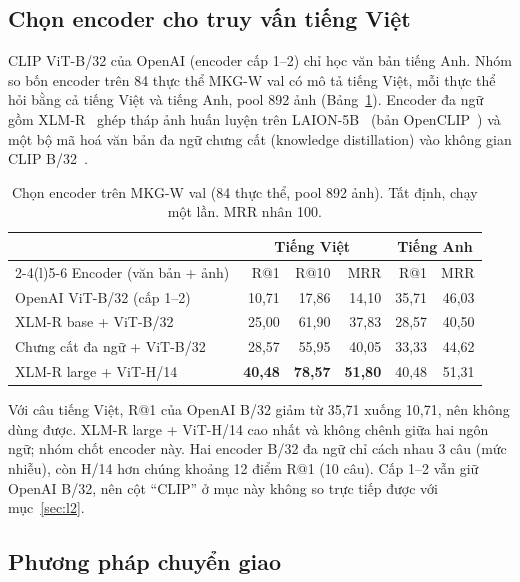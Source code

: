\subsection{Chọn encoder cho truy vấn tiếng Việt}\label{sec:vn-encoder}

CLIP ViT-B/32 của OpenAI (encoder cấp 1--2) chỉ học văn bản tiếng Anh. Nhóm so bốn encoder trên 84 thực thể MKG-W
val có mô tả tiếng Việt, mỗi thực thể hỏi bằng cả tiếng Việt và tiếng Anh, pool 892 ảnh
(Bảng~\ref{tab:vn-encoder}). Encoder đa ngữ gồm XLM-R~\cite{vn-conneau2020xlmr} ghép tháp ảnh huấn luyện trên
LAION-5B~\cite{vn-schuhmann2022laion5b} (bản OpenCLIP~\cite{vn-ilharco2021openclip}) và một bộ mã hoá văn bản đa
ngữ chưng cất (knowledge distillation) vào không gian CLIP B/32~\cite{vn-reimers2020multilingual}.

\begin{table}[t]
\centering
\caption{Chọn encoder trên MKG-W val (84 thực thể, pool 892 ảnh). Tất định, chạy một lần. MRR nhân 100.}
\label{tab:vn-encoder}
\footnotesize
\setlength{\tabcolsep}{3pt}
\begin{tabular}{@{}lrrrrr@{}}
\toprule
 & \multicolumn{3}{c}{Tiếng Việt} & \multicolumn{2}{c}{Tiếng Anh} \\
\cmidrule(lr){2-4}\cmidrule(l){5-6}
Encoder (văn bản + ảnh) & R@1 & R@10 & MRR & R@1 & MRR \\
\midrule
OpenAI ViT-B/32 (cấp 1--2) & 10,71 & 17,86 & 14,10 & 35,71 & 46,03 \\
XLM-R base + ViT-B/32 & 25,00 & 61,90 & 37,83 & 28,57 & 40,50 \\
Chưng cất đa ngữ + ViT-B/32 & 28,57 & 55,95 & 40,05 & 33,33 & 44,62 \\
XLM-R large + ViT-H/14 & \textbf{40,48} & \textbf{78,57} & \textbf{51,80} & 40,48 & 51,31 \\
\bottomrule
\end{tabular}
\end{table}

Với câu tiếng Việt, R@1 của OpenAI B/32 giảm từ 35,71 xuống 10,71, nên không dùng được. XLM-R large + ViT-H/14
cao nhất và không chênh giữa hai ngôn ngữ; nhóm chốt encoder này. Hai encoder B/32 đa ngữ chỉ cách nhau 3 câu
(mức nhiễu), còn H/14 hơn chúng khoảng 12 điểm R@1 (10 câu). Cấp 1--2 vẫn giữ OpenAI B/32, nên cột ``CLIP'' ở mục
này không so trực tiếp được với mục~\ref{sec:l2}.

\subsection{Phương pháp chuyển giao}\label{sec:vn-method}


